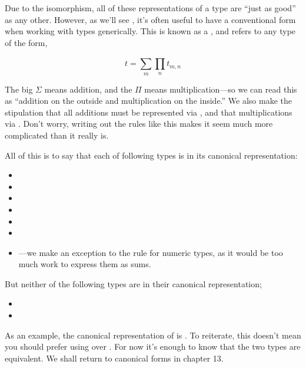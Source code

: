 \documentclass[book.tex]{subfiles}
\begin{document}
Due to the isomorphism, all of these representations of a type are ``just as
good'' as any other. However, as we'll see , it's
often useful to have a conventional form when working with types generically.
This  is known as a , and
refers to any type  of the form,

$$
{t = \sum_{m}^{}{\prod_{n}^{}{t_{m,n}}}}
$$

The big $\Sigma$ means addition, and
the $\Pi$ means multiplication---so we can read this as ``addition on the
outside and multiplication on the inside.'' We also make the stipulation that
all additions must be represented via , and that multiplications via
\ty{(,)}. Don't worry, writing out the rules like this makes it seem much more
complicated than it really is.

All of this is to say that each of following types is in its canonical
representation:

\begin{itemize}
  \item{\ty{()}}
  \item{}
  \item{}
  \item{}
  \item{}
  \item{}
  \item{---we make an exception to the rule for numeric
    types, as it would be too much work to express them as sums.}
\end{itemize}

But neither of the following types are in their canonical representation;

\begin{itemize}
  \item{}
  \item{}
\end{itemize}

As an example, the canonical representation of  is .
To reiterate, this doesn't mean you should prefer using  over
. For now it's enough to know that the two types are equivalent. We
shall return to canonical forms in chapter 13.

\end{document}

